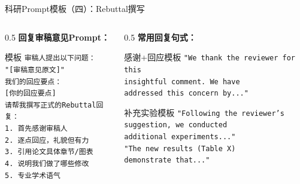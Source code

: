 \documentclass[aspectratio=169,11pt]{beamer}
\begin{document}
\begin{frame}[fragile]{科研Prompt模板（四）：Rebuttal撰写}
    \begin{columns}
        \begin{column}{0.5\textwidth}
            \textbf{回复审稿意见Prompt：}
            \begin{exampleblock}{模板}
                \scriptsize
                \texttt{审稿人提出以下问题：}\\
                \texttt{"[审稿意见原文]"}\\
                \texttt{我们的回应要点：}\\
                \texttt{[你的回应要点]}\\
                \texttt{请帮我撰写正式的Rebuttal回复：}\\
                \texttt{1. 首先感谢审稿人}\\
                \texttt{2. 逐点回应，礼貌但有力}\\
                \texttt{3. 引用论文具体章节/图表}\\
                \texttt{4. 说明我们做了哪些修改}\\
                \texttt{5. 专业学术语气}
            \end{exampleblock}
        \end{column}
        \begin{column}{0.5\textwidth}
            \textbf{常用回复句式：}
            \begin{block}{感谢+回应模板}
                \scriptsize
                \texttt{"We thank the reviewer for this}\\
                \texttt{insightful comment. We have}\\
                \texttt{addressed this concern by..."}
            \end{block}
            
            \begin{block}{补充实验模板}
                \scriptsize
                \texttt{"Following the reviewer's}\\
                \texttt{suggestion, we conducted}\\
                \texttt{additional experiments..."}\\
                \texttt{"The new results (Table X)}\\
                \texttt{demonstrate that..."}
            \end{block}
            

\end{column}
\end{columns}
\end{frame}
\end{document}
